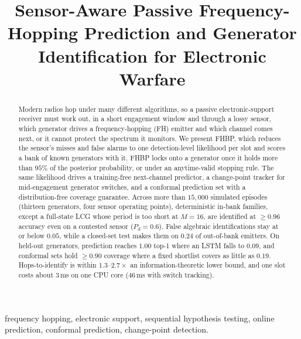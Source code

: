 \documentclass[conference]{IEEEtran}
\begin{document}
\title{Sensor-Aware Passive Frequency-Hopping Prediction and
Generator Identification for Electronic Warfare}

\author{
}
\maketitle
\begin{abstract}
Modern radios hop under many different algorithms, so a passive
electronic-support receiver must work out, in a short engagement window and
through a lossy sensor, which generator drives a frequency-hopping (FH) emitter
and which channel comes next, or it cannot protect the spectrum it monitors. We
present FHBP, which reduces the sensor's misses and false alarms to one
detection-level likelihood per slot and scores a bank of known generators with
it. FHBP locks onto a generator once it holds more than $95\%$ of the posterior
probability, or under an anytime-valid stopping rule. The same likelihood
drives a training-free next-channel predictor, a change-point tracker for
mid-engagement generator switches, and a conformal prediction set with a
distribution-free coverage guarantee. Across more than $15{,}000$ simulated
episodes (thirteen generators, four sensor operating points), deterministic
in-bank families, except a full-state LCG whose period is too short at
$M{=}16$, are identified at $\geq 0.96$ accuracy even on a contested sensor
($P_d{=}0.6$). False algebraic identifications stay at or below $0.05$, while a
closed-set test makes them on $0.24$ of out-of-bank emitters. On held-out
generators, prediction reaches $1.00$ top-1 where an LSTM falls to $0.09$, and
conformal sets hold $\geq 0.90$ coverage where a fixed shortlist covers as
little as $0.19$. Hops-to-identify is within $1.3$--$2.7\times$ an
information-theoretic lower bound, and one slot costs about $3$\,ms on one CPU
core ($46$\,ms with switch tracking).
\end{abstract}

\begin{IEEEkeywords}
frequency hopping, electronic support, sequential hypothesis testing,
online prediction, conformal prediction, change-point detection.
\end{IEEEkeywords}
\end{document}
